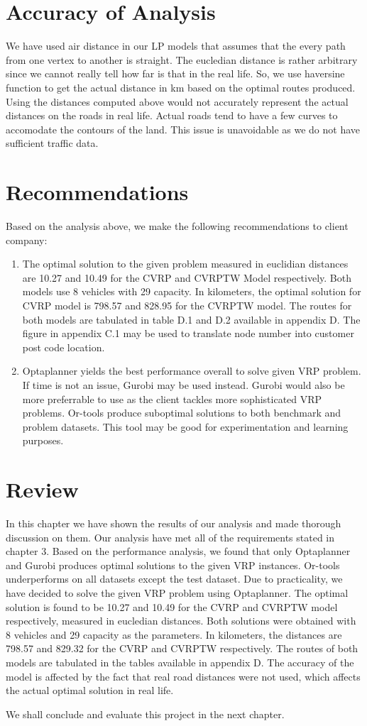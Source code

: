 \section{Accuracy of Analysis}
We have used air distance in our LP models that assumes that the every path from one vertex to another is straight.
The eucledian distance is rather arbitrary since we cannot really tell how far is that in the
real life. So, we use haversine function to get the actual distance in km based on the optimal routes produced.
Using the distances computed above would not accurately represent the actual distances on the roads in real life. Actual roads
 tend to have a few curves to accomodate the contours of the land. This issue
is unavoidable as we do not have sufficient traffic data.

\section{Recommendations}
Based on the analysis above, we make the following recommendations to client company:
\begin{enumerate}
\item The optimal solution to the given problem measured in euclidian distances are 10.27 and 10.49 for the CVRP and CVRPTW Model respectively.
Both models use 8 vehicles with 29 capacity. In kilometers, the optimal solution for CVRP model is 798.57 and 828.95 for the CVRPTW model.
The routes for both models are tabulated in table D.1 and D.2 available in appendix D. The figure in appendix C.1 may be used to translate
node number into customer post code location.
\item Optaplanner yields the best performance overall to solve given VRP problem. If time is not an issue, Gurobi may
be used instead. Gurobi would also be more preferrable to use as the client tackles more sophisticated VRP problems. Or-tools produce
suboptimal solutions to both benchmark and problem datasets. This tool may be good for experimentation and learning purposes.
\end{enumerate}

\section{Review}
In this chapter we have shown the results of our analysis and made thorough discussion on them. Our analysis have met
all of the requirements stated in chapter 3. Based on the performance analysis, we found that only Optaplanner and Gurobi
produces optimal solutions to the given VRP instances. Or-tools
underperforms on all datasets except the test dataset. Due to practicality, we have decided to solve the given VRP problem using Optaplanner.
The optimal solution is found to be 10.27 and 10.49 for the CVRP and
CVRPTW model respectively, measured in eucledian distances. Both solutions were obtained with 8 vehicles and 29 capacity as the parameters.
In kilometers, the distances are 798.57 and 829.32 for the CVRP and
CVRPTW respectively. The routes of both models are tabulated in the tables available in appendix D. The accuracy of the model
is affected by the fact that real road distances were not used, which affects the actual optimal solution in real life.

We shall conclude and evaluate this project in the next chapter.